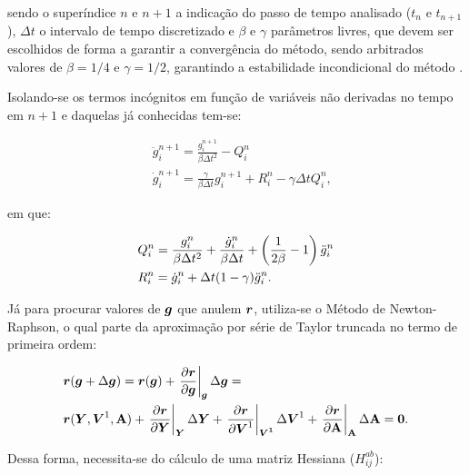 \noindent sendo o superíndice $n$ e $n+1$ a indicação do passo de tempo analisado ($t_n$ e $t_{n+1}$), $\Delta t$ o intervalo de tempo discretizado e $\beta$ e $\gamma$ parâmetros livres, que devem ser escolhidos de forma a garantir a convergência do método, sendo arbitrados valores de $\beta=1/4$ e $\gamma=1/2$, garantindo a estabilidade incondicional do método \cite{LINDFIELD2019239}.

Isolando-se os termos incógnitos em função de variáveis não derivadas no tempo em $n+1$ e daquelas já conhecidas tem-se:

\begin{subequations}
    \begin{align}
         & \ddot{g}_i^{n+1}=\frac{g_i^{n+1}}{\beta\Delta t^2}-Q_i^n                                \\
         & \dot{g}_i^{n+1}=\frac{\gamma}{\beta\Delta t}g_i^{n+1}+R_i^n-\gamma\Delta tQ_i^n\text{,}
    \end{align}
    \label{eq:CSD-Newmark2}
\end{subequations}

\noindent em que:

\begin{subequations}
    \begin{align}
         & Q_i^n=\frac{g_i^n}{\beta\Delta t^2}+\frac{\dot{g}_i^n}{\beta\Delta t}+\left({\frac{1}{2\beta}-1}\right)\ddot{g}_i^n \\
         & R_i^n=\dot{g}_i^n+\Delta t(1-\gamma)\ddot{g}_i^n\text{.}
    \end{align}
    \label{eq:CSD-QnRn}
\end{subequations}

Já para procurar valores de $\boldsymbol{g}$ que anulem $\boldsymbol{r}$, utiliza-se o Método de Newton-Raphson, o qual parte da aproximação por série de Taylor truncada no termo de primeira ordem:

\begin{equation}
    \begin{split}
        &\boldsymbol{r}(\boldsymbol{g}+\Delta\boldsymbol{g})=\boldsymbol{r}(\boldsymbol{g})+\left.\frac{\partial{\boldsymbol{r}}}{\partial{\boldsymbol{g}}}\right|_{\boldsymbol{\boldsymbol{g}}}\Delta\boldsymbol{g}=\\
        &\boldsymbol{r}(\boldsymbol{Y},\boldsymbol{V}^1,\boldsymbol{\mathrm{A}})+\left.\frac{\partial{\boldsymbol{r}}}{\partial{\boldsymbol{Y}}}\right|_{\boldsymbol{\boldsymbol{Y}}}\Delta\boldsymbol{Y}+\left.\frac{\partial{\boldsymbol{r}}}{\partial{\boldsymbol{V}^1}}\right|_{\boldsymbol{\boldsymbol{V}^1}}\Delta\boldsymbol{V}^1+\left.\frac{\partial{\boldsymbol{r}}}{\partial{\boldsymbol{\mathrm{A}}}}\right|_{\boldsymbol{\boldsymbol{\mathrm{A}}}}\Delta\boldsymbol{\mathrm{A}}=\boldsymbol{0}\text{.}
    \end{split}
\end{equation}

\noindent Dessa forma, necessita-se do cálculo de uma matriz Hessiana ($H_{ij}^{ab}$):

